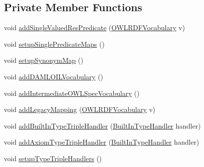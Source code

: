 \subsection*{Private Member Functions}
\begin{DoxyCompactItemize}
\item 
void \hyperlink{classorg_1_1coode_1_1owlapi_1_1rdfxml_1_1parser_1_1_o_w_l_r_d_f_consumer_af8b394c85073d7b1376f2526eb5883bd}{add\-Single\-Valued\-Res\-Predicate} (\hyperlink{enumorg_1_1semanticweb_1_1owlapi_1_1vocab_1_1_o_w_l_r_d_f_vocabulary}{O\-W\-L\-R\-D\-F\-Vocabulary} v)
\item 
void \hyperlink{classorg_1_1coode_1_1owlapi_1_1rdfxml_1_1parser_1_1_o_w_l_r_d_f_consumer_a4ffc12984178fbdc2e9a1d0d9f28d437}{setup\-Single\-Predicate\-Maps} ()
\item 
void \hyperlink{classorg_1_1coode_1_1owlapi_1_1rdfxml_1_1parser_1_1_o_w_l_r_d_f_consumer_aedde655eb896987863cdcf1613d6d122}{setup\-Synonym\-Map} ()
\item 
void \hyperlink{classorg_1_1coode_1_1owlapi_1_1rdfxml_1_1parser_1_1_o_w_l_r_d_f_consumer_ac954736e71d00432864de9ee7b380794}{add\-D\-A\-M\-L\-O\-I\-L\-Vocabulary} ()
\item 
void \hyperlink{classorg_1_1coode_1_1owlapi_1_1rdfxml_1_1parser_1_1_o_w_l_r_d_f_consumer_a973e48fb59e43d8d2e9778a7f1a9933a}{add\-Intermediate\-O\-W\-L\-Spec\-Vocabulary} ()
\item 
void \hyperlink{classorg_1_1coode_1_1owlapi_1_1rdfxml_1_1parser_1_1_o_w_l_r_d_f_consumer_a5330f289ddbabeded1d09cdf5fc2af34}{add\-Legacy\-Mapping} (\hyperlink{enumorg_1_1semanticweb_1_1owlapi_1_1vocab_1_1_o_w_l_r_d_f_vocabulary}{O\-W\-L\-R\-D\-F\-Vocabulary} v)
\item 
void \hyperlink{classorg_1_1coode_1_1owlapi_1_1rdfxml_1_1parser_1_1_o_w_l_r_d_f_consumer_adbe976bc0fec889fffd1319c2ca90e82}{add\-Built\-In\-Type\-Triple\-Handler} (\hyperlink{classorg_1_1coode_1_1owlapi_1_1rdfxml_1_1parser_1_1_built_in_type_handler}{Built\-In\-Type\-Handler} handler)
\item 
void \hyperlink{classorg_1_1coode_1_1owlapi_1_1rdfxml_1_1parser_1_1_o_w_l_r_d_f_consumer_acbb23860c309bf9dd8526e370764e339}{add\-Axiom\-Type\-Triple\-Handler} (\hyperlink{classorg_1_1coode_1_1owlapi_1_1rdfxml_1_1parser_1_1_built_in_type_handler}{Built\-In\-Type\-Handler} handler)
\item 
void \hyperlink{classorg_1_1coode_1_1owlapi_1_1rdfxml_1_1parser_1_1_o_w_l_r_d_f_consumer_a7162308c69a9d19e3095e87a61a21068}{setup\-Type\-Triple\-Handlers} ()
\item 

\end{DoxyCompactItemize}
